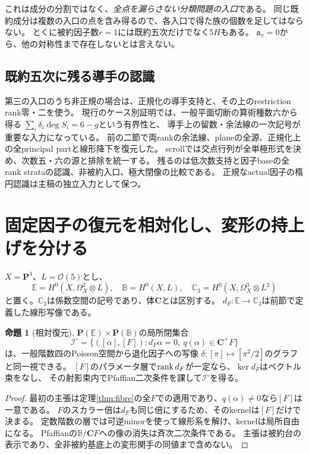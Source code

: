 \documentclass[a4paper,11pt]{ltjsarticle}
\theoremstyle{definition}
\newtheorem{proposition}[theorem]{命題}
\theoremstyle{definition}\newtheorem{definition}[theorem]{定義}
\theoremstyle{remark}\newtheorem{remark}[theorem]{注意}
\newcommand{\PP}{\mathbf P}\newcommand{\CC}{\mathbf C}
\newcommand{\cO}{\mathcal O}\newcommand{\cP}{\mathcal P}
\begin{document}
これは成分の分割ではなく、\emph{全点を漏らさない分類問題の入口}である。
同じ既約成分は複数の入口の点を含み得るので、各入口で得た族の個数を足してはならない。
とくに被約因子数$r=1$には既約五次だけでなく$5H$もある。
$\mathfrak a_\pi=0$から、他の対称性まで存在しないとは言えない。









\subsection{既約五次に残る導手の認識}
第三の入口のうち非正規の場合は、正規化の導手支持と、その上のrestriction rank零・二を使う。
現行のケース別証明では、一般平面切断の算術種数六から得る
$\sum_i\delta_i\deg S_i=6-g$という有界性と、
導手上の留数・余法線の一次記号が重要な入力になっている。
前の二節で両rankの余法線、planeの全源、正規化上の全principal partと線形降下を復元した。
scrollでは交点行列が全単極形式を決め、次数五・六の源と排除を統一する。
残るのは低次数支持と因子baseの全rank strataの認識、非被約入口、極大閉像の比較である。
正規なactual因子の楕円認識は主稿の独立入力として保つ。

\section{固定因子の復元を相対化し、変形の持上げを分ける}
$X=\PP^4$、$L=\cO(5)$とし、
\[
 \mathbb E=H^0(X,\Omega_X^2\otimes L),\quad
 \mathbb B=H^0(X,L),\quad
 \mathbb C_3=H^0(X,\Omega_X^3\otimes L^2)
\]
と置く。$\mathbb C_3$は係数空間の記号であり、体$\CC$とは区別する。
$d_F:\mathbb E\to\mathbb C_3$は前節で定義した線形写像である。

\begin{proposition}[相対復元]\label{prop:relative}
$\PP(\mathbb E)\times\PP(\mathbb B)$の局所閉集合
\[
 \mathcal I^\circ=
 \{([\alpha],[F]):d_F\alpha=0,\ q(\alpha)\in\CC^\times F\}
\]
は、一般階数四のPoisson空間から退化因子への写像
$\delta:[\pi]\mapsto[\pi^2/2]$のグラフと同一視できる。
$[F]$のパラメータ層で$\operatorname{rank} d_F$が一定なら、$\ker d_F$はベクトル束をなし、
その射影束内でPfaffian二次条件を課して$\mathcal I^\circ$を得る。
\end{proposition}
\begin{proof}
最初の主張は定理\ref{thm:fibre}の全$F$での適用であり、$q(\alpha)\ne0$なら$[F]$は一意である。
$F$のスカラー倍は$d_F$も同じ倍にするため、そのkernelは$[F]$だけで決まる。
定数階数の層では可逆minorを使って線形系を解け、kernelは局所自由になる。
Pfaffianの$\mathbb B/\CC F$への像の消失は斉次二次条件である。
主張は被約台の表示であり、全非被約基底上の変形関手の同値まで含めない。
\end{proof}
\end{document}
